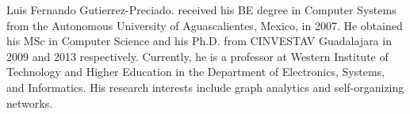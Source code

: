 \documentclass{ieeeaccess}
\begin{document}
\begin{IEEEbiography}{Luis Fernando Gutierrez-Preciado.} received 
his BE degree in Computer Systems from the Autonomous University 
of Aguascalientes, Mexico, in 2007. He obtained his MSc in Computer 
Science and his Ph.D. from CINVESTAV Guadalajara in 2009 and 2013 
respectively. Currently, he is a professor at Western Institute of
Technology and Higher Education in the Department of Electronics,
Systems, and Informatics. His research interests include graph
analytics and self-organizing networks.
\end{IEEEbiography}

\EOD
\end{document}
